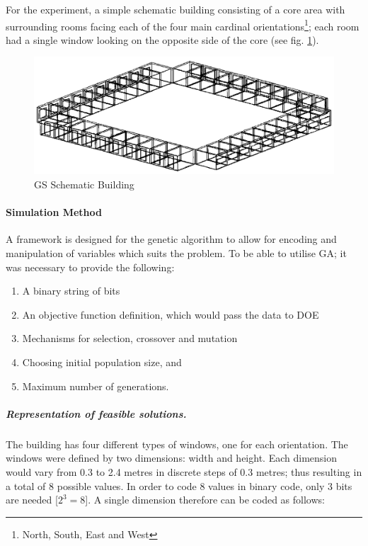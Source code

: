 For the experiment, a simple schematic building consisting of a core area with surrounding rooms facing each of the four main cardinal orientations\footnote{North, South, East and West}; each room had a single window looking on the opposite side of the core (see fig. \ref{fig:SchmBuild}).

\begin{figure}[htbp]
\centering
\includegraphics[width=\textwidth]{./Images/16-SchematicBuilding}
\caption[GS Schematic Building]{GS Schematic Building \cite{caldas01}}
\label{fig:SchmBuild}
\end{figure}

\paragraph{Simulation Method}\mbox{}

A framework is designed for the genetic algorithm to allow for encoding and manipulation of variables which suits the problem. To be able to utilise GA; it was necessary to provide the following:
\begin{enumerate}[nolistsep]
\item A binary string of bits
\item An objective function definition, which would pass the data to DOE
\item Mechanisms for selection, crossover and mutation
\item Choosing initial population size, and
\item Maximum number of generations.
\end{enumerate}

\subparagraph{Representation of feasible solutions.}\mbox{}

The building has four different types of windows, one for each orientation. The windows were defined by two dimensions: width and height. Each dimension would vary from 0.3 to 2.4 metres in discrete steps of 0.3 metres; thus resulting in a total of 8 possible values. In order to code 8 values in binary code, only 3 bits are needed [$2^3=8$]. A single dimension therefore can be coded as follows:


